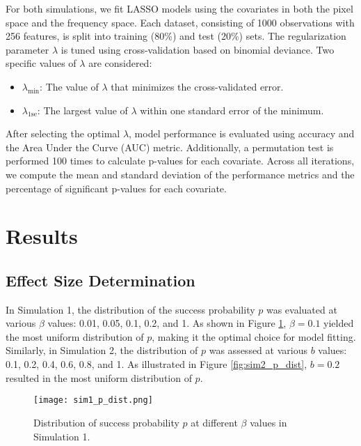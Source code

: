 \documentclass[12pt]{article}
\begin{document}
For both simulations, we fit LASSO models using the covariates in both the pixel space and the frequency space. Each dataset, consisting of 1000 observations with 256 features, is split into training (80\%) and test (20\%) sets. The regularization parameter \( \lambda \) is tuned using cross-validation based on binomial deviance. Two specific values of \( \lambda \) are considered:

\begin{itemize}
    \item \( \lambda_{\text{min}} \): The value of \( \lambda \) that minimizes the cross-validated error.
    \item \( \lambda_{\text{1se}} \): The largest value of \( \lambda \) within one standard error of the minimum.
\end{itemize}

After selecting the optimal \( \lambda \), model performance is evaluated using accuracy and the Area Under the Curve (AUC) metric. Additionally, a permutation test is performed 100 times to calculate p-values for each covariate. Across all iterations, we compute the mean and standard deviation of the performance metrics and the percentage of significant p-values for each covariate.


\section*{Results}

\subsection*{Effect Size Determination}

In Simulation 1, the distribution of the success probability \( p \) was evaluated at various \( \beta \) values: 0.01,
0.05, 0.1, 0.2, and 1. As shown in Figure \ref{fig:sim1_p_dist}, \( \beta = 0.1 \) yielded the most uniform distribution
of \( p \), making it the optimal choice for model fitting. Similarly, in Simulation 2, the distribution of \( p \) was assessed at various \( b \) values: 0.1, 0.2, 0.4, 0.6, 0.8, and 1. As illustrated in Figure \ref{fig:sim2_p_dist}, \( b = 0.2 \) resulted in the most uniform distribution of \( p \). 

\begin{figure}[h!] 
	\centering
	\texttt{[image: sim1\_p\_dist.png]} 
  \caption{Distribution of success probability \( p \) at different \( \beta \) values in Simulation 1.}
	\label{fig:sim1_p_dist} 
\end{figure}
\end{document}
